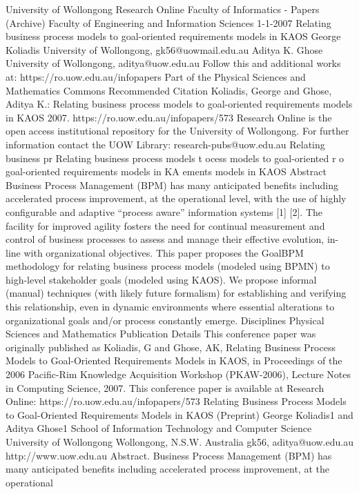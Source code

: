 University of Wollongong
Research Online
Faculty of Informatics - Papers (Archive) Faculty of Engineering and Information
Sciences
1-1-2007
Relating business process models to goal-oriented requirements models in
KAOS
George Koliadis
University of Wollongong, gk56@uowmail.edu.au
Aditya K. Ghose
University of Wollongong, aditya@uow.edu.au
Follow this and additional works at: https://ro.uow.edu.au/infopapers
Part of the Physical Sciences and Mathematics Commons
Recommended Citation
Koliadis, George and Ghose, Aditya K.: Relating business process models to goal-oriented requirements
models in KAOS 2007.
https://ro.uow.edu.au/infopapers/573
Research Online is the open access institutional repository for the University of Wollongong. For further information
contact the UOW Library: research-pubs@uow.edu.au 
Relating business pr Relating business process models t ocess models to goal-oriented r o goal-oriented requirements models in KA ements models in KAOS
Abstract
Business Process Management (BPM) has many anticipated benefits including accelerated process
improvement, at the operational level, with the use of highly configurable and adaptive “process aware”
information systems [1] [2]. The facility for improved agility fosters the need for continual measurement
and control of business processes to assess and manage their effective evolution, in-line with
organizational objectives. This paper proposes the GoalBPM methodology for relating business process
models (modeled using BPMN) to high-level stakeholder goals (modeled using KAOS). We propose
informal (manual) techniques (with likely future formalism) for establishing and verifying this relationship,
even in dynamic environments where essential alterations to organizational goals and/or process
constantly emerge.
Disciplines
Physical Sciences and Mathematics
Publication Details
This conference paper was originally published as Koliadis, G and Ghose, AK, Relating Business Process
Models to Goal-Oriented Requirements Models in KAOS, in Proceedings of the 2006 Pacific-Rim
Knowledge Acquisition Workshop (PKAW-2006), Lecture Notes in Computing Science, 2007.
This conference paper is available at Research Online: https://ro.uow.edu.au/infopapers/573 
Relating Business Process Models to
Goal-Oriented Requirements Models in KAOS
(Preprint)
George Koliadis1 and Aditya Ghose1
School of Information Technology and Computer Science
University of Wollongong
Wollongong, N.S.W. Australia
{gk56, aditya}@uow.edu.au
http://www.uow.edu.au
Abstract. Business Process Management (BPM) has many anticipated
benefits including accelerated process improvement, at the operational
